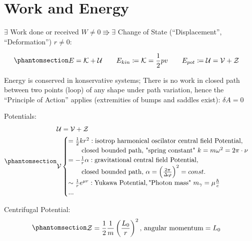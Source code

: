\documentclass[
  letterpaper,
  DIV=11,
  numbers=noendperiod]{scrartcl}
\begin{document}
\hfill\break
\hfill\break

\section{Work and Energy}\label{sec-workenergy}

\(\exists\) Work done or received \(W \neq 0 \Rrightarrow \exists\)
Change of State (``Displacement'', ``Deformation'') \(r \neq 0\):

\begin{equation}\phantomsection\label{eq-energy}{\begin{split} &
E = \mathcal{K} + \mathcal{U}  \qquad  E_{kin} \coloneqq \mathcal{K} = \frac{1}{2}pv   \qquad   E_{pot} \coloneqq \mathcal{U} = \mathcal{V} + \mathcal{Z}
\end{split}}\end{equation}

Energy is conserved in konservative systems; There is no work in closed
path between two points (loop) of any shape under path variation, hence
the ``Principle of Action'' applies (extremities of bumps and saddles
exist): \(\delta A = 0\)

Potentials:
\begin{equation}\phantomsection\label{eq-potential}{\begin{split} &
\mathcal{U} = \mathcal{V} + \mathcal{Z}
\\&
\mathcal{V} 
    \begin{cases}
      = \frac{1}{2} kr^2 : \text{isotrop harmonical oscilator central field Potential, } \\
        \qquad \text{closed bounded path, } \text{"spring constant" } k = m\omega^2 = 2\pi \cdot \nu  \\
      = -\frac{1}{r}\alpha: \text{gravitational central field Potential, } \\
        \qquad \text{closed bounded path, } \alpha = \left( \frac{2\pi}{\Delta \varphi} \right)^2 = const. \\
      \sim \frac{1}{r}e^{\mu r} : \text{Yukawa Potential}, \text{"Photon mass" } m_{\gamma} = \mu \frac{\hbar}{c} \\
      ...
    \end{cases}
\end{split}}\end{equation}

Centrifugal Potential:
\begin{equation}\phantomsection\label{eq-centrifugalpot}{\begin{split} &
\mathcal{Z} = \frac{1}{2} \frac{1}{m} \left( \frac{L_0}{r} \right)^2 \text{, angular momentum}=L_0
\end{split}}\end{equation}
\end{document}
